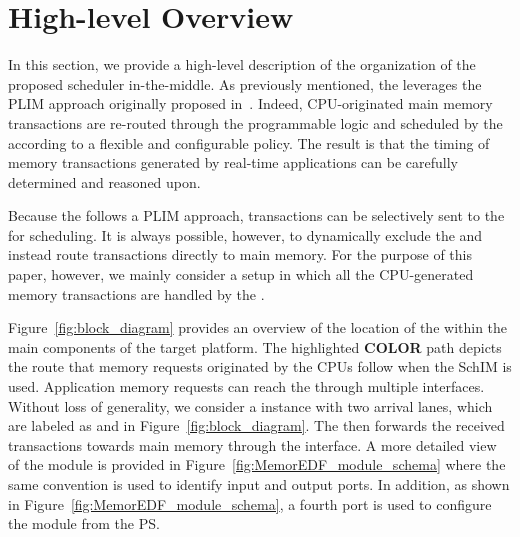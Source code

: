 \section{High-level Overview}

In this section, we provide a high-level description of the
organization of the proposed scheduler in-the-middle. As previously
mentioned, the \schim leverages the PLIM approach originally proposed
in~\cite{PLIM20}. Indeed, CPU-originated main memory transactions are
re-routed through the programmable logic and scheduled by the \schim
according to a flexible and configurable policy. The result is that
the timing of memory transactions generated by real-time applications
can be carefully determined and reasoned upon. 

Because the \schim follows a PLIM approach, transactions can be
selectively sent to the \schim for scheduling. It is always possible,
however, to dynamically exclude the \schim and instead route
transactions directly to main memory. For the purpose of this paper,
however, we mainly consider a setup in which all the CPU-generated
memory transactions are handled by the \schim.

Figure~\ref{fig:block_diagram} provides an overview of the location of
the \schim within the main components of the target platform. The
highlighted {\bf COLOR} path depicts the route that memory requests
originated by the CPUs follow when the SchIM is used. Application
memory requests can reach the \schim through multiple
interfaces. Without loss of generality, we consider a \schim instance
with two arrival lanes, which are labeled as  and 
in Figure~\ref{fig:block_diagram}. The \schim then forwards the
received transactions towards main memory through the 
interface. A more detailed view of the \schim module is provided in
Figure~\ref{fig:MemorEDF_module_schema} where the same convention is
used to identify input and output ports. In addition, as shown in
Figure~\ref{fig:MemorEDF_module_schema}, a fourth  port is
used to configure the \schim module from the PS.


